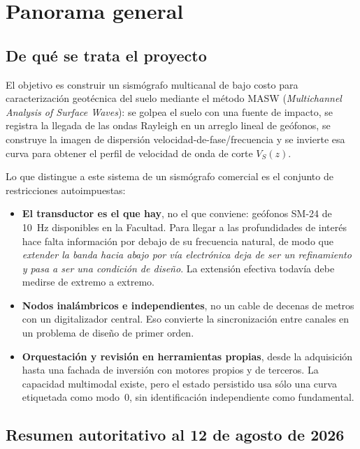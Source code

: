 \section{Panorama general}
\label{sec:panorama}

\subsection{De qu\'e se trata el proyecto}

El objetivo es construir un sismógrafo multicanal de bajo costo para
caracterizaci\'on geot\'ecnica del suelo mediante el m\'etodo MASW
(\emph{Multichannel Analysis of Surface Waves}): se golpea el suelo con una
fuente de impacto, se registra la llegada de las ondas Rayleigh en un arreglo
lineal de ge\'ofonos, se construye la imagen de dispersi\'on
velocidad-de-fase/frecuencia y se invierte esa curva para obtener el perfil de
velocidad de onda de corte $V_S(z)$.

Lo que distingue a este sistema de un sism\'ografo comercial es el conjunto de
restricciones autoimpuestas:

\begin{itemize}[itemsep=0.2em]
\item \textbf{El transductor es el que hay}, no el que conviene: ge\'ofonos
SM-24 de \SI{10}{\hertz} disponibles en la Facultad. Para llegar a las
profundidades de inter\'es hace falta informaci\'on por debajo de su frecuencia
natural, de modo que \emph{extender la banda hacia abajo por v\'ia electr\'onica
deja de ser un refinamiento y pasa a ser una condici\'on de dise\~no}. La
extensi\'on efectiva todav\'ia debe medirse de extremo a extremo.
\item \textbf{Nodos inal\'ambricos e independientes}, no un cable de decenas de
metros con un digitalizador central. Eso convierte la sincronizaci\'on entre
canales en un problema de dise\~no de primer orden.
\item \textbf{Orquestaci\'on y revisi\'on en herramientas propias}, desde la
adquisici\'on hasta una fachada de inversi\'on con motores propios y de terceros.
La capacidad multimodal existe, pero el estado persistido usa s\'olo una curva
etiquetada como modo~0, sin identificaci\'on independiente como fundamental.
\end{itemize}

\subsection{Resumen autoritativo al 12 de agosto de 2026}


